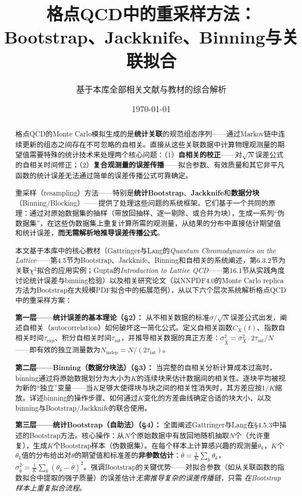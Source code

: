 \documentclass[12pt,a4paper]{ctexart}
\title{\heiti 格点QCD中的重采样方法：\\
Bootstrap、Jackknife、Binning与关联拟合}
\author{基于本库全部相关文献与教材的综合解析}
\date{\today}
\theoremstyle{definition}
\begin{document}
\maketitle

\begin{abstract}
\noindent
格点QCD的Monte Carlo模拟生成的是\textbf{统计关联}的规范组态序列——通过Markov链中连续更新的组态之间存在不可忽略的自相关。直接从这些关联数据中计算物理观测量的期望值需要特殊的统计技术来处理两个核心问题：（1）\textbf{自相关的校正}——对$\sqrt{N}$误差公式的自相关时间修正；（2）\textbf{复合观测量的误差传播}——拟合参数、有效质量和其它非平凡函数的统计误差无法通过简单的误差传播公式可靠确定。

重采样（resampling）方法——特别是\textbf{统计Bootstrap}、\textbf{Jackknife}和\textbf{数据分块}（Binning/Blocking）——提供了处理这些问题的系统框架。它们基于一个共同的原理：通过对原始数据集的抽样（带放回抽样、逐一剔除、或合并为块），生成一系列``伪数据集''，在这些伪数据集上重复计算所需的观测量，从结果的分布中直接估计期望值和统计误差，\textbf{而无需解析地推导误差传播公式}。

本文基于本库中的核心教材（Gattringer与Lang的\textit{Quantum Chromodynamics on the Lattice}——第4.5节为Bootstrap、Jackknife、Binning和自相关的系统阐述，第6.3.2节为关联$\chi^2$拟合的应用实例；Gupta的\textit{Introduction to Lattice QCD}——第16.1节从实践角度讨论统计误差与binning检验）以及相关研究论文（以NNPDF4.0的Monte Carlo replica方法为Bootstrap在大规模PDF拟合中的拓展范例），从以下六个层次系统解析格点QCD中的重采样方案：

\textbf{第一层——统计误差的基本理论（§2）：}
从不相关数据的标准$\sigma/\sqrt{N}$误差公式出发，阐述自相关（autocorrelation）如何破坏这一简化公式。定义自相关函数$C_X(t)$、指数自相关时间$\tau_{\text{exp}}$、积分自相关时间$\tau_{\text{int}}$，并推导相关数据的真正方差：$\sigma^2_{\hat X} = \sigma_X^2 \cdot 2\tau_{\text{int}} / N$——即有效的独立测量数为$N_{\text{indep}} = N/(2\tau_{\text{int}})$。

\textbf{第二层——Binning（数据分块法）（§3）：}
当完整的自相关分析计算成本过高时，binning通过将原始数据划分为大小为$K$的连续块来估计数据间的相关性。逐块平均被视为新的``独立''变量——当$K$足够大使得块与块之间的相关性消失时，其方差应按$1/K$缩放。详述binning的操作步骤、如何通过$K$变化的方差曲线确定合适的块大小、以及binning与Bootstrap/Jackknife的联合使用。

\textbf{第三层——统计Bootstrap（自助法）（§4）：}
全面阐述Gattringer与Lang在§4.5.3中描述的Bootstrap方法。核心操作：从$N$个原始数据中有放回地随机抽取$N$个（允许重复），生成$K$个Bootstrap样本（伪数据集）。在每个样本上计算感兴趣的观测量$\theta_k$，$K$个$\theta_k$值的分布给出对$\theta$的期望值和标准差的\textbf{非参数估计}：$\bar\theta = \frac{1}{K}\sum_k\theta_k$，$\sigma_{\bar\theta}^2 = \frac{1}{K}\sum_k(\theta_k-\bar\theta)^2$。强调Bootstrap的关键优势——对拟合参数（如从关联函数的指数拟合中提取的强子质量）的误差估计\emph{无需推导复杂的误差传播链}，只需 \emph{在Bootstrap样本上重复拟合流程}。


\end{abstract}
\end{document}
